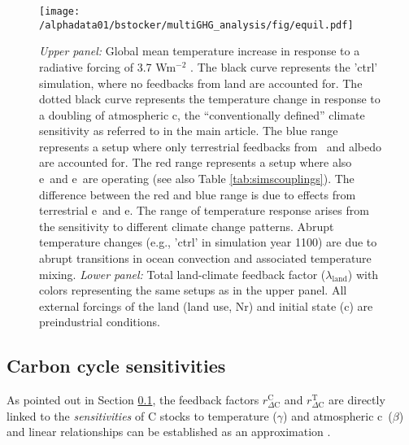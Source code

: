 \begin{figure}[ht!]
\begin{center}
\texttt{[image: /alphadata01/bstocker/multiGHG\_analysis/fig/equil.pdf]}
\end{center}
\caption[Time series for temperature and feedback factors in an equilibrium climate sensitivity experiment]{{\sl Upper panel:} Global mean temperature increase in response to a radiative forcing of 3.7 Wm$^{-2}$ . The black curve represents the 'ctrl' simulation, where no feedbacks from land are accounted for. The dotted black curve represents the temperature change in response to a doubling of atmospheric c\coo , the ``conventionally defined'' climate sensitivity as referred to in the main article. The blue range represents a setup where only terrestrial feedbacks from \dc\ and albedo are accounted for. The red range represents a setup where also e\nno\ and e\chh\ are operating (see also Table \ref{tab:simscouplings}). The difference between the red and blue range is due to effects from terrestrial e\nno\ and e\chh . The range of temperature response arises from the sensitivity to different climate change patterns. Abrupt temperature changes (e.g., 'ctrl' in simulation year 1100) are due to abrupt transitions in ocean convection and associated temperature mixing. {\sl Lower panel:} Total land-climate feedback factor ($\lambda_{\mathrm{land}}$) with colors representing the same setups as in the upper panel. All external forcings of the land (land use, Nr) and initial state (c\coo ) are preindustrial conditions.}
\label{fig:equil}
\end{figure}

\clearpage

\subsection{Carbon cycle sensitivities}
\label{sec:sensitivities}
As pointed out in Section \ref{sec:sensitivities}, the feedback factors $r_{\Delta\mathrm{C}}^{\mathrm{C}}$ and $r_{\Delta\mathrm{C}}^{\mathrm{T}}$ are directly linked to the {\it sensitivities} of C stocks to temperature ($\gamma$) and atmospheric c\coo\ ($\beta$) and linear relationships can be established as an approximation \cite{gregory09jclim}.\\

